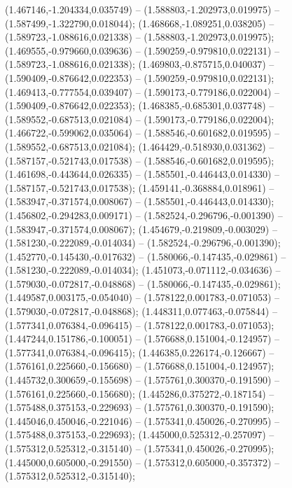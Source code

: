  (1.467146,-1.204334,0.035749) -- (1.588803,-1.202973,0.019975) -- (1.587499,-1.322790,0.018044);
 (1.468668,-1.089251,0.038205) -- (1.589723,-1.088616,0.021338) -- (1.588803,-1.202973,0.019975);
 (1.469555,-0.979660,0.039636) -- (1.590259,-0.979810,0.022131) -- (1.589723,-1.088616,0.021338);
 (1.469803,-0.875715,0.040037) -- (1.590409,-0.876642,0.022353) -- (1.590259,-0.979810,0.022131);
 (1.469413,-0.777554,0.039407) -- (1.590173,-0.779186,0.022004) -- (1.590409,-0.876642,0.022353);
 (1.468385,-0.685301,0.037748) -- (1.589552,-0.687513,0.021084) -- (1.590173,-0.779186,0.022004);
 (1.466722,-0.599062,0.035064) -- (1.588546,-0.601682,0.019595) -- (1.589552,-0.687513,0.021084);
 (1.464429,-0.518930,0.031362) -- (1.587157,-0.521743,0.017538) -- (1.588546,-0.601682,0.019595);
 (1.461698,-0.443644,0.026335) -- (1.585501,-0.446443,0.014330) -- (1.587157,-0.521743,0.017538);
 (1.459141,-0.368884,0.018961) -- (1.583947,-0.371574,0.008067) -- (1.585501,-0.446443,0.014330);
 (1.456802,-0.294283,0.009171) -- (1.582524,-0.296796,-0.001390) -- (1.583947,-0.371574,0.008067);
 (1.454679,-0.219809,-0.003029) -- (1.581230,-0.222089,-0.014034) -- (1.582524,-0.296796,-0.001390);
 (1.452770,-0.145430,-0.017632) -- (1.580066,-0.147435,-0.029861) -- (1.581230,-0.222089,-0.014034);
 (1.451073,-0.071112,-0.034636) -- (1.579030,-0.072817,-0.048868) -- (1.580066,-0.147435,-0.029861);
 (1.449587,0.003175,-0.054040) -- (1.578122,0.001783,-0.071053) -- (1.579030,-0.072817,-0.048868);
 (1.448311,0.077463,-0.075844) -- (1.577341,0.076384,-0.096415) -- (1.578122,0.001783,-0.071053);
 (1.447244,0.151786,-0.100051) -- (1.576688,0.151004,-0.124957) -- (1.577341,0.076384,-0.096415);
 (1.446385,0.226174,-0.126667) -- (1.576161,0.225660,-0.156680) -- (1.576688,0.151004,-0.124957);
 (1.445732,0.300659,-0.155698) -- (1.575761,0.300370,-0.191590) -- (1.576161,0.225660,-0.156680);
 (1.445286,0.375272,-0.187154) -- (1.575488,0.375153,-0.229693) -- (1.575761,0.300370,-0.191590);
 (1.445046,0.450046,-0.221046) -- (1.575341,0.450026,-0.270995) -- (1.575488,0.375153,-0.229693);
 (1.445000,0.525312,-0.257097) -- (1.575312,0.525312,-0.315140) -- (1.575341,0.450026,-0.270995);
 (1.445000,0.605000,-0.291550) -- (1.575312,0.605000,-0.357372) -- (1.575312,0.525312,-0.315140);
